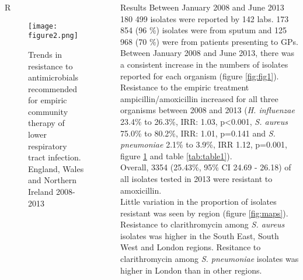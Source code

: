 \documentclass[final, 14pt]{beamer}
\begin{document}
\begin{frame}
\begin{columns}[t]
\begin{minipage}[T]{.95\textwidth}
\begin{block}{\textcolor{comp_blue}{R}}  

  \begin{figure}
  \texttt{[image: figure2.png]}
  \caption{Trends in resistance to antimicrobials recommended for empiric community therapy of lower respiratory tract infection. England, Wales and Northern Ireland 2008-2013}
  \label{fig:fig2} 
  \end{figure}

\end{block}  
\end{minipage}
  
 \begin{minipage}[T]{.95\textwidth} %
  \begin{block}{Results}
   Between January 2008 and June 2013 180 499 isolates were reported by 142 labs. 
   173 854 (96 \%) isolates were from sputum and 125 968 (70 \%) were from patients presenting to GPs. \\
   Between January 2008 and June 2013, there was a consistent increase in the numbers of isolates reported for each organism (figure \ref{fig:fig1}).\\
Resistance to the empiric treatment ampicillin/amoxicillin increased for all three organisms between 2008 and 2013 (\textit{H. influenzae} 23.4\% to 26.3\%, IRR: 1.03, p\textless0.001, \textit{S. aureus} 75.0\% to 80.2\%, IRR: 1.01, p=0.141 and \textit{S. pneumoniae} 2.1\% to 3.9\%, IRR 1.12, p=0.001, figure \ref{fig:fig2} and table \ref{tab:table1}).\\
   Overall, 3354 (25.43\%, 95\% CI 24.69 - 26.18) of all isolates tested in 2013 were resistant to amoxicillin. \\%
   Little variation in the proportion of isolates resistant was seen by region (figure \ref{fig:maps}). 
   Resistance to clarithromycin among \textit{S. aureus} isolates was higher in the South East, South West and London regions. 
   Resitance to clarithromycin among \textit{S. pneumoniae} isolates was higher in London than in other regions. \\
   \vspace{1 cm}

\end{block}
\end{minipage}
\end{columns}
\end{frame}
\end{document}
